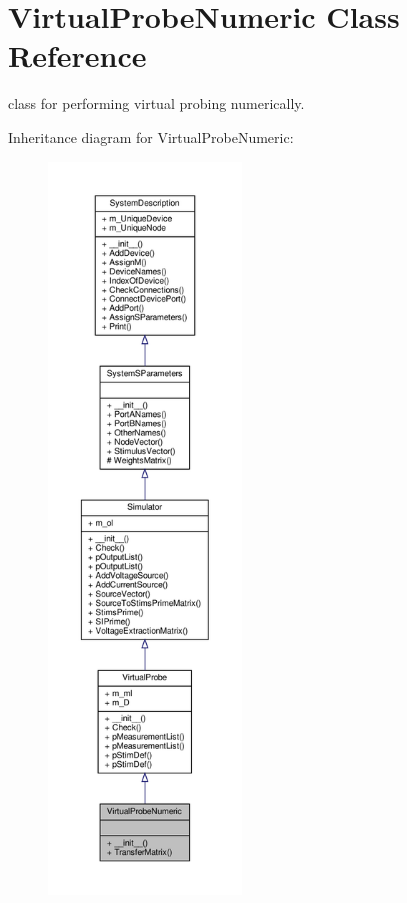 \hypertarget{classSignalIntegrity_1_1SystemDescriptions_1_1VirtualProbeNumeric_1_1VirtualProbeNumeric}{}\section{Virtual\+Probe\+Numeric Class Reference}
\label{classSignalIntegrity_1_1SystemDescriptions_1_1VirtualProbeNumeric_1_1VirtualProbeNumeric}


class for performing virtual probing numerically.  




Inheritance diagram for Virtual\+Probe\+Numeric\+:\nopagebreak
\begin{figure}[H]
\begin{center}
\leavevmode
\includegraphics[height=550pt]{classSignalIntegrity_1_1SystemDescriptions_1_1VirtualProbeNumeric_1_1VirtualProbeNumeric__inherit__graph}
\end{center}
\end{figure}


